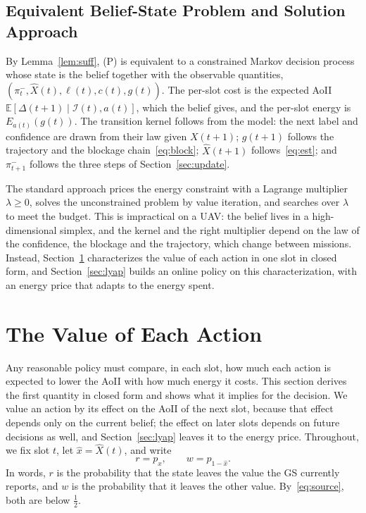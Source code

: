 \documentclass[5p,twocolumn]{elsarticle}
\theoremstyle{remark}
\newcommand{\E}{\mathbb{E}}
\newcommand{\I}{\mathcal{I}}
\newcommand{\lab}{\ell}
\newcommand{\xh}{\hat{x}}
\begin{document}
\subsection{Equivalent Belief-State Problem and Solution Approach}
By Lemma~\ref{lem:suff}, (P) is equivalent to a constrained Markov decision process whose state is the belief together with the observable quantities, $(\pi^-_t,\hat X(t),\lab(t),c(t),g(t))$. The per-slot cost is the expected AoII $\E[\Delta(t+1)\mid\I(t),a(t)]$, which the belief gives, and the per-slot energy is $E_{a(t)}(g(t))$. The transition kernel follows from the model: the next label and confidence are drawn from their law given $X(t+1)$; $g(t+1)$ follows the trajectory and the blockage chain~\eqref{eq:block}; $\hat X(t+1)$ follows~\eqref{eq:est}; and $\pi^-_{t+1}$ follows the three steps of Section~\ref{sec:update}.

The standard approach prices the energy constraint with a Lagrange multiplier $\lambda\ge0$, solves the unconstrained problem by value iteration, and searches over $\lambda$ to meet the budget. This is impractical on a UAV: the belief lives in a high-dimensional simplex, and the kernel and the right multiplier depend on the law of the confidence, the blockage and the trajectory, which change between missions. Instead, Section~\ref{sec:structure} characterizes the value of each action in one slot in closed form, and Section~\ref{sec:lyap} builds an online policy on this characterization, with an energy price that adapts to the energy spent.
\section{The Value of Each Action}\label{sec:structure}
Any reasonable policy must compare, in each slot, how much each action is expected to lower the AoII with how much energy it costs. This section derives the first quantity in closed form and shows what it implies for the decision. We value an action by its effect on the AoII of the next slot, because that effect depends only on the current belief; the effect on later slots depends on future decisions as well, and Section~\ref{sec:lyap} leaves it to the energy price. Throughout, we fix slot $t$, let $\xh=\hat X(t)$, and write
\begin{equation}\label{eq:rw}
r=p_{\xh},\qquad w=p_{1-\xh}.
\end{equation}
In words, $r$ is the probability that the state leaves the value the GS currently reports, and $w$ is the probability that it leaves the other value. By~\eqref{eq:source}, both are below $\frac12$.
\end{document}
